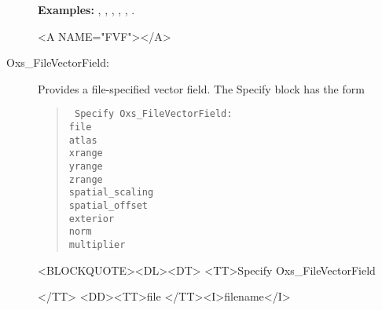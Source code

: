 \begin{description}
\textbf{Examples:} , ,
, ,
, .

\begin{rawhtml}<A NAME="FVF"></A>\end{rawhtml}%
%
\item[Oxs\_FileVectorField:\label{item:FileVectorField}]
   Provides a file-specified vector field.  The Specify block has the form
      \begin{latexonly}
      \begin{quote}\tt
      Specify Oxs\_FileVectorField: \ocb\\
       \bi file  \\
       \bi atlas \\
       \bi xrange \ocb{}\ccb\\
       \bi yrange \ocb{}\ccb\\
       \bi zrange \ocb{}\ccb\\
       \bi spatial\_scaling \ocb{}\ccb\\
       \bi spatial\_offset \ocb{}\ccb\\
       \bi exterior \\
       \bi norm  \\
       \bi multiplier \\
      \ccb
      \end{quote}
      \end{latexonly}
      \begin{rawhtml}<BLOCKQUOTE><DL><DT>
      <TT>Specify Oxs_FileVectorField {</TT>
      <DD><TT>file </TT><I>filename</I>

}
\end{rawhtml}
\end{description}
